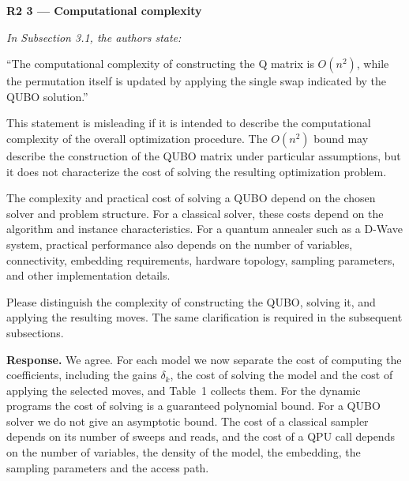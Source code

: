 \documentclass[12pt]{article}
\newenvironment{rc}[1]{\par\medskip\noindent\textbf{#1}\par\nopagebreak\noindent\itshape\renewcommand{\emph}[1]{\textbf{##1}}\ignorespaces}{\par}
\newcommand{\answer}[1]{\par\smallskip\noindent\textbf{Response.} #1\par}
\begin{document}
\begin{rc}{R2 3 --- Computational complexity}
In Subsection 3.1, the authors state:

``The computational complexity of constructing the Q matrix is $O(n^2)$, while the permutation itself is updated by applying the single swap indicated by the QUBO solution.''

This statement is misleading if it is intended to describe the computational complexity of the overall optimization procedure. The $O(n^2)$ bound may describe the construction of the QUBO matrix under particular assumptions, but it does not characterize the cost of solving the resulting optimization problem.

The complexity and practical cost of solving a QUBO depend on the chosen solver and problem structure. For a classical solver, these costs depend on the algorithm and instance characteristics. For a quantum annealer such as a D-Wave system, practical performance also depends on the number of variables, connectivity, embedding requirements, hardware topology, sampling parameters, and other implementation details.

Please distinguish the complexity of constructing the QUBO, solving it, and applying the resulting moves. The same clarification is required in the subsequent subsections.
\end{rc}
\answer{We agree. For each model we now separate the cost of computing the coefficients, including the gains $\delta_k$, the cost of solving the model and the cost of applying the selected moves, and Table~1 collects them. For the dynamic programs the cost of solving is a guaranteed polynomial bound. For a QUBO solver we do not give an asymptotic bound. The cost of a classical sampler depends on its number of sweeps and reads, and the cost of a QPU call depends on the number of variables, the density of the model, the embedding, the sampling parameters and the access path.}
\end{document}
